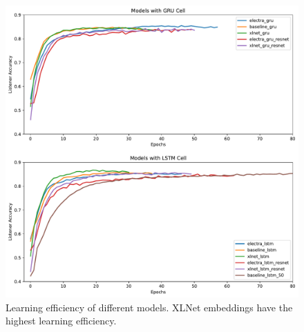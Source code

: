 \begin{figure}[ht]
\centering
\includegraphics[width=\textwidth]{assets/learning.pdf}
\caption[Learning]{Learning efficiency of different models. XLNet embeddings have the highest learning efficiency.}
\label{figure:learning}
\end{figure}
